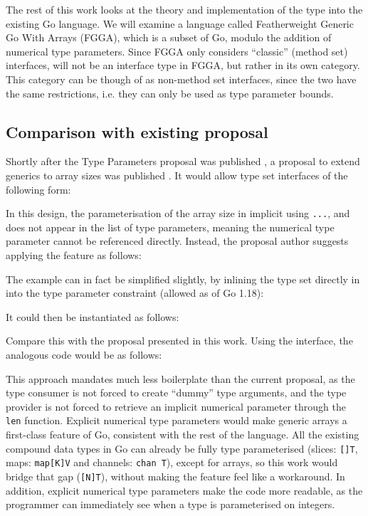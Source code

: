 The rest of this work looks at the theory and implementation of the 
type into the existing Go language. We will examine a language called
Featherweight Generic Go With Arrays (FGGA), which is a subset of Go, modulo the
addition of numerical type parameters. Since FGGA only considers ``classic''
(method set) interfaces,  will not be an interface type in FGGA, but
rather in its own category. This category can be though of as non-method set
interfaces, since the two have the same restrictions, i.e. they can only be used
as type parameter bounds.

\subsection{Comparison with existing proposal}

Shortly after the Type Parameters proposal was published
\autocite{genericsProposal}, a proposal to extend generics to array sizes was
published \autocite{goArrayProposal}. It would allow type set interfaces of the
following form:


In this design, the parameterisation of the array size in implicit using
\texttt{...}, and does not appear in the list of type parameters, meaning the
numerical type parameter cannot be referenced directly. Instead, the proposal
author suggests applying the feature as follows:


The example can in fact be simplified slightly, by inlining the type set
directly in into the type parameter constraint (allowed as of Go 1.18):


It could then be instantiated as follows:


Compare this with the proposal presented in this work. Using the 
interface, the analogous code would be as follows:


This approach mandates much less boilerplate than the current proposal, as the
type consumer is not forced to create ``dummy'' type arguments, and the type
provider is not forced to retrieve an implicit numerical parameter through the
\texttt{len} function. Explicit numerical type parameters would make generic
arrays a first-class feature of Go, consistent with the rest of the language.
All the existing compound data types in Go can already be fully type
parameterised (slices: \texttt{[]T}, maps: \texttt{map[K]V} and channels:
\texttt{chan T}), except for arrays, so this work would bridge that gap
(\texttt{[N]T}), without making the feature feel like a workaround. In addition,
explicit numerical type parameters make the code more readable, as the
programmer can immediately see when a type is parameterised on integers.


